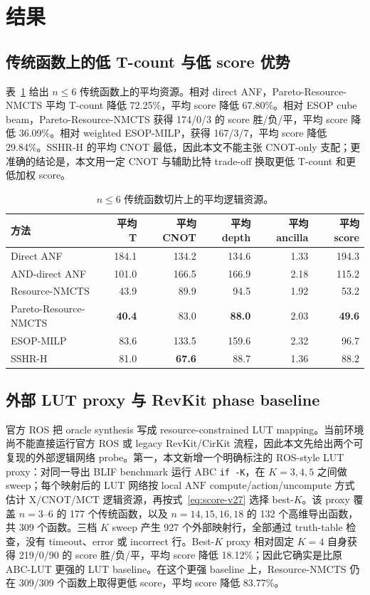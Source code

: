 \documentclass[UTF8,fontset=macnew,11pt]{ctexart}
\newcommand{\method}{Resource-NMCTS}
\newcommand{\anf}{\ensuremath{\mathrm{ANF}}}
\newcommand{\mct}{\ensuremath{\mathrm{MCT}}}
\begin{document}
\section{结果}

\subsection{传统函数上的低 T-count 与低 score 优势}

表~\ref{tab:traditional-v27} 给出 $n\leq6$ 传统函数上的平均资源。相对 direct ANF，Pareto-\method{} 平均 T-count 降低 72.25\%，平均 score 降低 67.80\%。相对 ESOP cube beam，Pareto-\method{} 获得 174/0/3 的 score 胜/负/平，平均 score 降低 36.09\%。相对 weighted ESOP-MILP，获得 167/3/7，平均 score 降低 29.84\%。SSHR-H 的平均 CNOT 最低，因此本文不能主张 CNOT-only 支配；更准确的结论是，本文用一定 CNOT 与辅助比特 trade-off 换取更低 T-count 和更低加权 score。

\begin{table}[H]
\centering
\small
\caption{$n\leq6$ 传统函数切片上的平均逻辑资源。}
\label{tab:traditional-v27}
\begin{tabular}{lrrrrr}
\toprule
方法 & 平均 T & 平均 CNOT & 平均 depth & 平均 ancilla & 平均 score \\
\midrule
Direct ANF & 184.1 & 134.2 & 134.6 & 1.33 & 194.3 \\
AND-direct ANF & 101.0 & 166.5 & 166.9 & 2.18 & 115.2 \\
\method{} & 43.9 & 89.9 & 94.5 & 1.92 & 53.2 \\
Pareto-\method{} & \textbf{40.4} & 83.0 & \textbf{88.0} & 2.03 & \textbf{49.6} \\
ESOP-MILP & 83.6 & 133.5 & 159.6 & 2.32 & 96.7 \\
SSHR-H & 81.0 & \textbf{67.6} & 88.7 & 1.36 & 88.2 \\
\bottomrule
\end{tabular}
\end{table}

\subsection{外部 LUT proxy 与 RevKit phase baseline}

官方 ROS 把 oracle synthesis 写成 resource-constrained LUT mapping。当前环境尚不能直接运行官方 ROS 或 legacy RevKit/CirKit 流程，因此本文先给出两个可复现的外部逻辑网络 probe。第一，本文新增一个明确标注的 ROS-style LUT proxy：对同一导出 BLIF benchmark 运行 ABC \texttt{if -K}，在 $K=3,4,5$ 之间做 sweep；每个映射后的 LUT 网络按 local \anf{} compute/action/uncompute 方式估计 X/CNOT/\mct{} 逻辑资源，再按式~\eqref{eq:score-v27} 选择 best-$K$。该 proxy 覆盖 $n=3$--$6$ 的 177 个传统函数，以及 $n=14,15,16,18$ 的 132 个高维导出函数，共 309 个函数。三档 $K$ sweep 产生 927 个外部映射行，全部通过 truth-table 检查，没有 timeout、error 或 incorrect 行。Best-$K$ proxy 相对固定 $K=4$ 自身获得 219/0/90 的 score 胜/负/平，平均 score 降低 18.12\%；因此它确实是比原 ABC-LUT 更强的 LUT baseline。在这个更强 baseline 上，\method{} 仍在 309/309 个函数上取得更低 score，平均 score 降低 83.77\%。
\end{document}

